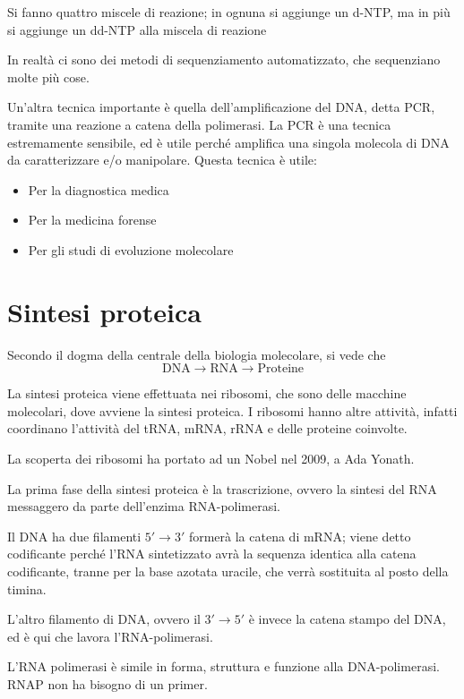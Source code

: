 Si fanno quattro miscele di reazione; in ognuna si aggiunge un d-NTP, ma in più si aggiunge un dd-NTP alla miscela di reazione

In realtà ci sono dei metodi di sequenziamento automatizzato, che sequenziano molte più cose.

Un'altra tecnica importante è quella dell'amplificazione del DNA, detta PCR, tramite una reazione a catena della polimerasi.
La PCR è una tecnica estremamente sensibile, ed è utile perché amplifica una singola molecola di DNA da caratterizzare e/o manipolare.
Questa tecnica è utile:
\begin{itemize}
\item Per la diagnostica medica
\item Per la medicina forense
\item Per gli studi di evoluzione molecolare
\end{itemize}

\clearpage

\section{Sintesi proteica}

Secondo il dogma della centrale della biologia molecolare, si vede che
\[
\text{DNA} \rightarrow \text{RNA} \rightarrow \text{Proteine}
\]


La sintesi proteica viene effettuata nei ribosomi, che sono delle macchine molecolari, dove avviene la sintesi proteica. I ribosomi hanno altre attività, infatti coordinano l'attività del tRNA, mRNA, rRNA e delle proteine coinvolte.

La scoperta dei ribosomi ha portato ad un Nobel nel 2009, a Ada Yonath.

La prima fase della sintesi proteica è la trascrizione, ovvero la sintesi del RNA messaggero da parte dell'enzima RNA-polimerasi.

Il DNA ha due filamenti $5' \to 3'$ formerà la catena di mRNA;{} viene detto codificante perché l'RNA sintetizzato avrà la sequenza identica alla catena codificante, tranne per la base azotata uracile, che verrà sostituita al posto della timina.

L'altro filamento di DNA, ovvero il $3' \to 5'$ è invece la catena stampo del DNA, ed è qui che lavora l'RNA-polimerasi.

L'RNA polimerasi è simile in forma, struttura e funzione alla DNA-polimerasi. RNAP non ha bisogno di un primer.


